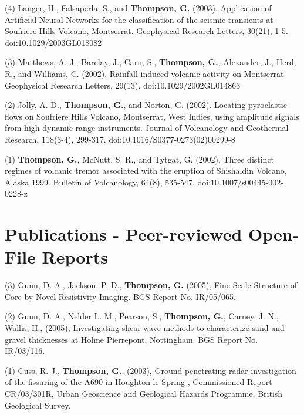 \documentclass[margin,line]{res}
\begin{document}
\begin{resume}
	(4) Langer, H., Falsaperla, S., and {\bf Thompson, G.} (2003). Application of Artificial Neural Networks for the classification of the seismic transients at Soufriere Hills Volcano, Montserrat. Geophysical Research Letters, 30(21), 1-5. doi:10.1029/2003GL018082

	(3) Matthews, A. J., Barclay, J., Carn, S., {\bf Thompson, G.}, Alexander, J., Herd, R., and Williams, C. (2002). Rainfall-induced volcanic activity on Montserrat. Geophysical Research Letters, 29(13). doi:10.1029/2002GL014863

	(2) Jolly, A. D., {\bf Thompson, G.}, and Norton, G. (2002). Locating pyroclastic flows on Soufriere Hills Volcano, Montserrat, West Indies, using amplitude signals from high dynamic range instruments. Journal of Volcanology and Geothermal Research, 118(3-4), 299-317. doi:10.1016/S0377-0273(02)00299-8

	(1) {\bf Thompson, G.}, McNutt, S. R., and Tytgat, G. (2002). Three distinct regimes of volcanic tremor associated with the eruption of Shishaldin Volcano, Alaska 1999. Bulletin of Volcanology, 64(8), 535-547. doi:10.1007/s00445-002-0228-z


\section{\sc Publications - Peer-reviewed Open-File Reports}

	(3) Gunn, D. A., Jackson, P. D., {\bf Thompson, G.} (2005), Fine Scale Structure of Core by Novel Resistivity Imaging. BGS Report No. IR/05/065.

	(2) Gunn, D. A., Nelder L. M., Pearson, S., {\bf Thompson, G.}, Carney, J. N., Wallis, H., (2005), Investigating shear wave methods to characterize sand and gravel thicknesses at Holme Pierrepont, Nottingham. BGS Report No. IR/03/116.

	(1) Cuss, R. J., {\bf Thompson, G.}, (2003), Ground penetrating radar investigation of the fissuring of the A690 in Houghton-le-Spring , Commissioned Report CR/03/301R, Urban Geoscience and Geological Hazards Programme, British Geological Survey.

\begin{comment}	
\section{\sc Theses}

	{\bf Thompson, G.}, (1999), Modelling of seismo-volcanic sources. Ph.D. Thesis, University of Leeds, UK.


\end{comment}
\end{resume}
\end{document}
